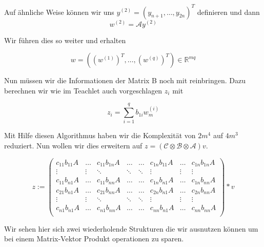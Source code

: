 Auf ähnliche Weise können wir uns $y^{(2)}=(y_{n+1},\dots,y_{2n})^{T}$ definieren und dann
\begin{equation*}
w^{(2)} = \mathcal{A}y^{(2)}
\end{equation*}

Wir führen dies so weiter und erhalten

\begin{equation*}
w=( (w^{(1)})^T , \dots, (w^{(q)})^T) \in \mathbb{R}^{mq}
\end{equation*}

Nun müssen wir die Informationen der Matrix B noch mit reinbringen. Dazu berechnen wir wie im Teachlet auch vorgeschlagen $z_i$ mit

\begin{equation*}
z_i = \sum_{i=1}^{q} b_{1i} w_m^{(i)}
\end{equation*}

Mit Hilfe diesen Algorithmus haben wir die Komplexität von $2m^4$ auf $4m^3$ reduziert.
Nun wollen wir dies erweitern auf $z=(\mathcal{C} \otimes \mathcal{B} \otimes \mathcal{A})v$.


\begin{equation} z:=
\begin{pmatrix}
c_{11} b_{11} A & \dots  & c_{11} b_{1n} A & \dots & \dots & c_{1n}b_{11}A & \dots & c_{1n}b_{1n}A  \\

\vdots & \vdots & \ddots & \ddots  & \ddots & \vdots & \vdots & \vdots \\
c_{11} b_{n1} A & \dots  & c_{11} b_{nn} A & \dots & \dots & c_{1n}b_{n1}A & \dots & c_{1n}b_{nn}A  \\
c_{21} b_{n1} A & \dots  & c_{21} b_{nn} A & \dots & \dots & c_{2n}b_{n1}A & \dots & c_{2n}b_{nn}A  \\
\vdots & \vdots & \ddots & \ddots  & \ddots & \vdots & \vdots & \vdots \\
c_{n1} b_{n1} A & \dots  & c_{n1} b_{nn} A & \dots & \dots & c_{nn}b_{n1}A & \dots & c_{nn}b_{nn}A  \\
\end{pmatrix} * v
\end{equation}

Wir sehen hier sich zwei wiederholende Strukturen die wir ausnutzen können um bei einem Matrix-Vektor Produkt operationen zu sparen.

